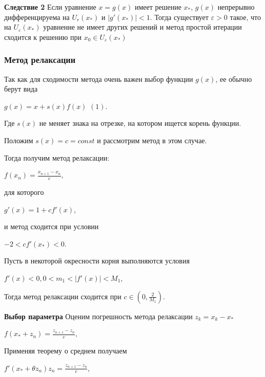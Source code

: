 \documentclass{article}
\begin{document}
				
				\textbf{Следствие 2} Если уравнение $x = g(x)$ имеет решение  $x_*$, $g(x)$ непрерывно дифференцируема на $U_r(x_*)$ и $|g'(x_*)|<1$. Тогда существует $\varepsilon > 0$ такое, что на $U_{\varepsilon}(x_*)$ уравнение не имеет других решений и метод простой итерации сходится к решению при $x_0 \in U_{\varepsilon}(x_*)$
				
			\subsubsection{Метод релаксации}
			
				Так как для сходимости метода очень важен выбор функции $g(x)$,  ее обычно берут вида \begin{center}$g(x)=x+s(x)f(x)$ $(1)$.\end{center}
				
				Где $s(x)$ не меняет знака на отрезке, на котором ищется корень функции.
				
				Положим $s(x) = c = const $ и рассмотрим метод в этом случае.
				
				Тогда получим метод релаксации:
				
				\begin{center}$f(x_n) = \frac{x_{n+1}-x_{n}}{c}$,\end{center}
				
				для которого \begin{center}$g'(x) = 1+cf'(x)$,\end{center} и метод сходится при условии 
				
				\begin{center}$-2<cf'(x_*)<0$.\end{center}
				
				Пусть в некоторой окресности корня выполняются условия
				
				\begin{center}$f'(x)<0, 0<m_1<|f'(x)|<M_1$,\end{center}

				Тогда метод релаксации сходится при $c \in (0,\frac{2}{M_1}).$
				
				\textbf{Выбор параметра}
				Оценим погрешность метода релаксации $z_k=x_k-x_*$
				
				\begin{center}$f(x_*+z_n) = \frac{z_{n+1}-z_{n}}{c}$,\end{center}

				Применяя теорему о среднем получаем
				
				\begin{center}$f'(x_*+{\theta}z_n)z_n = \frac{z_{n+1}-z_{n}}{c}$,\end{center}
				
\end{document}
